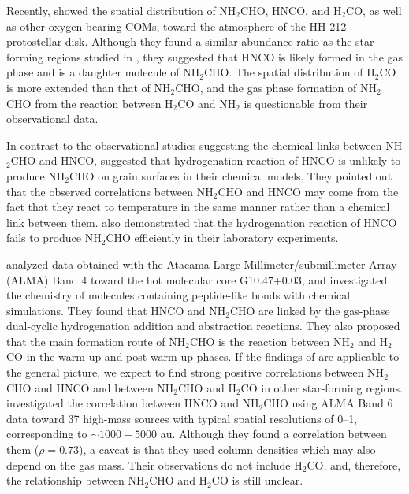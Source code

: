 \documentclass[twocolumn, twocolappendix]{aastex631}
\begin{document}
Recently, \citet{2022ApJ...937...10L} showed the spatial distribution of NH$_{2}$CHO, HNCO, and H$_{2}$CO, as well as other oxygen-bearing COMs, toward the atmosphere of the HH 212 protostellar disk.
Although they found a similar abundance ratio as the star-forming regions studied in \citet{2019ESC.....3.2122L}, they suggested that HNCO is likely formed in the gas phase and is a daughter molecule of NH$_{2}$CHO.
The spatial distribution of H$_{2}$CO is more extended than that of NH$_{2}$CHO, and the gas phase formation of NH$_{2}$CHO from the reaction between H$_{2}$CO and NH$_{2}$ is questionable from their observational data.

In contrast to the observational studies suggesting the chemical links between NH$_{2}$CHO and HNCO, \citet{2018MNRAS.474.2796Q} suggested that hydrogenation reaction of HNCO is unlikely to produce NH$_{2}$CHO on grain surfaces in their chemical models.
They pointed out that the observed correlations between NH$_{2}$CHO and HNCO may come from the fact that they react to temperature in the same manner rather than a chemical link between them.
\citet{2015A&A...576A..91N} also demonstrated that the hydrogenation reaction of HNCO fails to produce NH$_{2}$CHO efficiently in their laboratory experiments.

\citet{2020ApJ...895...86G} analyzed data obtained with the Atacama Large Millimeter/submillimeter Array (ALMA) Band 4 toward the hot molecular core G10.47+0.03, and investigated the chemistry of molecules containing peptide-like bonds with chemical simulations.
They found that HNCO and NH$_{2}$CHO are linked by the gas-phase dual-cyclic hydrogenation addition and abstraction reactions.
 They also proposed that the main formation route of NH$_{2}$CHO is the reaction between NH$_{2}$ and H$_{2}$CO in the warm-up and post-warm-up phases.
 If the findings of \citet{2020ApJ...895...86G} are applicable to the general picture, we expect to find strong positive correlations between NH$_{2}$CHO and HNCO and between NH$_{2}$CHO and H$_{2}$CO in other star-forming regions.
\citet{2022A&A...668A.109N} investigated the correlation between HNCO and NH$_{2}$CHO using ALMA Band 6 data toward 37 high-mass sources with typical spatial resolutions of 0--1, corresponding to $\sim1000-5000$ au.
Although they found a correlation between them ($\rho=0.73$), a caveat is that they used column densities which may also depend on the gas mass.
Their observations do not include H$_{2}$CO, and, therefore, the relationship between NH$_{2}$CHO and H$_{2}$CO is still unclear.
\end{document}
